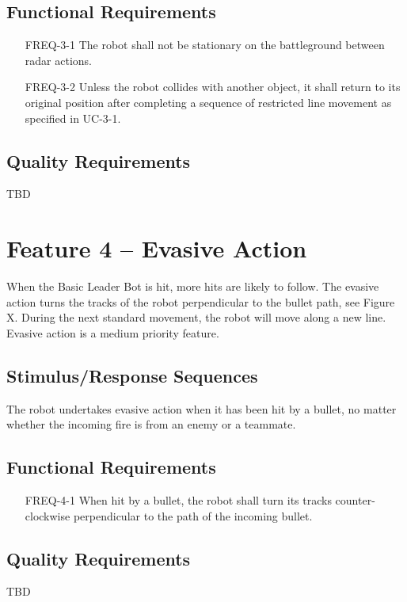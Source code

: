 \documentclass{scrreprt}
\begin{document}
\subsection{Functional Requirements}
\begin{itemize}
\item[FREQ-3-1] The robot shall not be stationary on the battleground between radar actions. 
\item[FREQ-3-2] Unless the robot collides with another object, it shall return to its original position after completing a sequence of restricted line movement as specified in UC-3-1.
\end{itemize}

\subsection{Quality Requirements}
TBD

\section{Feature 4 -- Evasive Action }
When the Basic Leader Bot is hit, more hits are likely to follow. The evasive action turns the tracks of the robot perpendicular to the bullet path, see Figure X. During the next standard movement, the robot will move along a new line. Evasive action is a medium priority feature.

\subsection{Stimulus/Response Sequences}
The robot undertakes evasive action when it has been hit by a bullet, no matter whether the incoming fire is from an enemy or a teammate.
	
\subsection{Functional Requirements}
\begin{itemize}
\item[FREQ-4-1] When hit by a bullet, the robot shall turn its tracks counter-clockwise perpendicular to the path of the incoming bullet.
\end{itemize}

\subsection{Quality Requirements}
TBD
\end{document}
